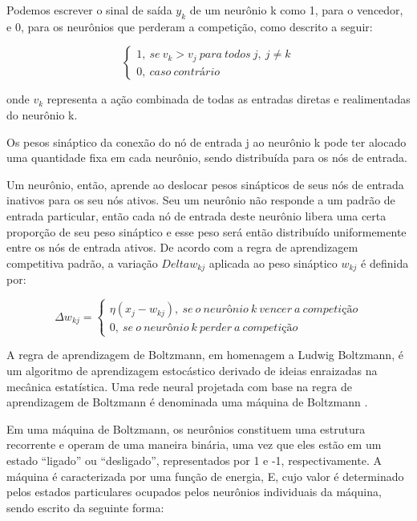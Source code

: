     Podemos escrever o sinal de saída $y_{k}$ de um neurônio k como 1, para o vencedor, e 0, para os neurônios que perderam a competição, como descrito a seguir:
    
    \begin{equation}
        \left\{\begin{array}{ll}1,\ se\ v_{k} > v_{j}\ para\ todos\ j,\ j \neq k\\0,\ caso\ contrário \end{array}\right.
    \end{equation}
    
    onde $v_{k}$ representa a ação combinada de todas as entradas diretas e realimentadas do neurônio k.
    
    Os pesos sináptico da conexão do nó de entrada j ao neurônio k pode ter alocado uma quantidade fixa em cada neurônio, sendo distribuída para os nós de entrada. 
    
    Um neurônio, então, aprende ao deslocar pesos sinápticos de seus nós de entrada inativos para os seu nós ativos. Seu um neurônio não responde a um padrão de entrada particular, então cada nó de entrada deste neurônio libera uma certa proporção de seu peso sináptico e esse peso será então distribuído uniformemente entre os nós de entrada ativos. De acordo com a regra de aprendizagem competitiva padrão, a variação $Delta w_{kj}$ aplicada ao peso sináptico $w_{kj}$ é definida por:
    
    \begin{equation} \label{eq:boltz}
        \Delta w_{kj} = \left\{\begin{array}{ll}\eta(x_{j} - w_{kj}),\ se\ o\ neurônio\ k\ vencer\ a\ competição\\0,\ se\ o\ neurônio\ k\ perder\ a\ competição \end{array}\right.
    \end{equation}
    
A regra de aprendizagem de Boltzmann, em homenagem a Ludwig Boltzmann, é um algoritmo de aprendizagem estocástico derivado de ideias
enraizadas na mecânica estatística. Uma rede neural projetada com base na regra de aprendizagem de Boltzmann é denominada uma máquina de Boltzmann \cite{ackley1985learning}. 

Em uma máquina de Boltzmann, os neurônios constituem uma estrutura recorrente e operam de uma maneira binária, uma vez que eles estão em um estado ``ligado'' ou ``desligado'', representados por 1 e -1, respectivamente. A máquina é caracterizada por uma função de energia, E, cujo valor é determinado pelos estados particulares ocupados pelos neurônios individuais da máquina, sendo escrito da seguinte forma:
    
